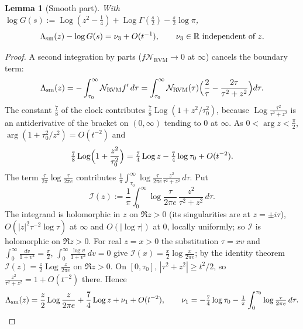 \documentclass[11pt,reqno]{amsart}
\numberwithin{equation}{section}
\theoremstyle{plain}
\newtheorem{lemma}[theorem]{Lemma}
\theoremstyle{definition}
\theoremstyle{remark}
\newcommand{\R}{\mathbb R}
\newcommand{\Log}{\operatorname{Log}}
\newcommand{\RVM}{\mathrm{RVM}}
\newcommand{\NR}{\mathcal N_{\RVM}}
\begin{document}
\begin{lemma}[Smooth part]\label{lem:TR-smooth}
With $\log G(s):=\Log(z^2-\tfrac14)+\Log\Gamma(\tfrac s2)-\tfrac s2\log\pi$,
\begin{equation}\label{eq:smooth-difference}
 \Lambda_{\rm sm}(z)-\log G(s)=\nu_3+O(t^{-1}),\qquad\nu_3\in\R\ \text{independent of }z .
\end{equation}
\end{lemma}

\begin{proof}
A second integration by parts ($f\NR\to0$ at $\infty$) cancels the boundary term:
\begin{equation}\label{eq:smooth-J-ibp}
 \Lambda_{\rm sm}(z)=-\int_{\tau_0}^\infty\NR f'\,d\tau=\int_{\tau_0}^\infty\NR(\tau)\Bigl(\frac2\tau-\frac{2\tau}{\tau^2+z^2}\Bigr)d\tau .
\end{equation}
The constant $\tfrac78$ of the clock contributes $\tfrac78\Log(1+z^2/\tau_0^2)$, because $\Log\frac{\tau^2}{\tau^2+z^2}$ is an antiderivative of the bracket on $(0,\infty)$ tending to $0$ at $\infty$.  As $0<\arg z<\frac\pi2$, $\arg(1+\tau_0^2/z^2)=O(t^{-2})$ and
\begin{equation}\label{eq:J2}
 \tfrac78\Log\Bigl(1+\frac{z^2}{\tau_0^2}\Bigr)=\tfrac74\Log z-\tfrac74\log\tau_0+O(t^{-2}).
\end{equation}
The term $\frac\tau{2\pi}\log\frac\tau{2\pi e}$ contributes $\frac1\pi\int_{\tau_0}^\infty\log\frac{\tau}{2\pi e}\frac{z^2}{\tau^2+z^2}\,d\tau$.  Put
\begin{equation}\label{eq:I-def}
 \mathcal I(z):=\frac1\pi\int_0^\infty\log\frac{\tau}{2\pi e}\,\frac{z^2}{\tau^2+z^2}\,d\tau .
\end{equation}
The integrand is holomorphic in $z$ on $\Re z>0$ (its singularities are at $z=\pm i\tau$), $O(|z|^2\tau^{-2}\log\tau)$ at $\infty$ and $O(|\log\tau|)$ at $0$, locally uniformly; so $\mathcal I$ is holomorphic on $\Re z>0$.  For real $z=x>0$ the substitution $\tau=xv$ and $\int_0^\infty\frac{dv}{1+v^2}=\frac\pi2$, $\int_0^\infty\frac{\log v}{1+v^2}\,dv=0$ give $\mathcal I(x)=\frac x2\log\frac x{2\pi e}$; by the identity theorem $\mathcal I(z)=\frac z2\Log\frac z{2\pi e}$ on $\Re z>0$.  On $[0,\tau_0]$, $|\tau^2+z^2|\ge t^2/2$, so $\frac{z^2}{\tau^2+z^2}=1+O(t^{-2})$ there.  Hence
\begin{equation}\label{eq:J-asymp}
 \Lambda_{\rm sm}(z)=\frac z2\Log\frac z{2\pi e}+\frac74\Log z+\nu_1+O(t^{-2}),\qquad
 \nu_1=-\tfrac74\log\tau_0-\tfrac1\pi\int_0^{\tau_0}\log\tfrac\tau{2\pi e}\,d\tau .
\end{equation}

\end{proof}
\end{document}
